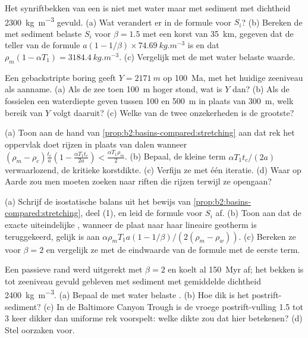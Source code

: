 \begin{exercise}[$\star\star$]\label{exo:b2:basins-compared:8}
Het synriftbekken van een  is niet met water maar met sediment met dichtheid
\qty{2300}{kg.m^{-3}} gevuld. (a) Wat verandert er in de formule voor $S_i$? (b) Bereken de met sediment belaste
$S_i$ voor $\beta = 1.5$ met een korst van \qty{35}{km}, gegeven dat de teller van de formule
$a(1 - 1/\beta)\times\qty{74.69}{kg.m^{-3}}$ is en dat $\rho_m(1 - \alpha T_1) =
\qty{3184.4}{kg.m^{-3}}$. (c) Vergelijk met de met water belaste waarde.
\end{exercise}

\begin{exercise}[$\star\star$]\label{exo:b2:basins-compared:9}
Een gebackstripte boring geeft $Y = \qty{2171}{m}$ op \qty{100}{Ma}, met het huidige zeeniveau als aanname. (a)
Als de zee toen \qty{100}{m} hoger stond, wat is $Y$ dan? (b) Als de fossielen een waterdiepte geven
tussen 100 en \qty{500}{m} in plaats van \qty{300}{m}, welk bereik van $Y$ volgt daaruit? (c) Welke van de
twee onzekerheden is de grootste?
\end{exercise}

\begin{exercise}[$\star\star\star$]\label{exo:b2:basins-compared:10}
(a) Toon aan de hand van \cref{prop:b2:basins-compared:stretching} aan dat rek het oppervlak doet rijzen
in plaats van dalen wanneer $(\rho_m - \rho_c)\frac{t_c}{a}\left(1 - \frac{\alpha T_1 t_c}{2a}\right) <
\frac{\alpha T_1\rho_m}{2}$. (b) Bepaal, de kleine term $\alpha T_1 t_c/(2a)$ verwaarlozend, de
kritieke korstdikte. (c) Verfijn ze met één iteratie. (d) Waar op Aarde zou men moeten zoeken
naar riften die rijzen terwijl ze opengaan?
\end{exercise}

\begin{exercise}[$\star\star\star$]\label{exo:b2:basins-compared:11}
(a) Schrijf de isostatische balans uit het bewijs van \cref{prop:b2:basins-compared:stretching}, deel
(1), en leid de formule voor $S_i$ af. (b) Toon aan dat de exacte uiteindelijke , wanneer
de plaat naar haar lineaire geotherm is teruggekeerd, gelijk is aan $\alpha\rho_m T_1 a(1 - 1/\beta)/(2(\rho_m -
\rho_w))$. (c) Bereken ze voor $\beta = 2$ en vergelijk ze met de eindwaarde van de
formule met de eerste term.
\end{exercise}

\begin{exercise}[$\star\star\star$]\label{exo:b2:basins-compared:12}
Een passieve rand werd uitgerekt met $\beta = 2$ en koelt al \qty{150}{Myr} af; het
bekken is tot zeeniveau gevuld gebleven met sediment met gemiddelde dichtheid \qty{2400}{kg.m^{-3}}.
(a) Bepaal de met water belaste . (b) Hoe dik is het postrift-sediment?
(c) In de Baltimore Canyon Trough is de vroege postrift-vulling 1.5 tot 3 keer dikker dan
uniforme rek voorspelt: welke dikte zou dat hier betekenen? (d) Stel oorzaken voor.
\end{exercise}

